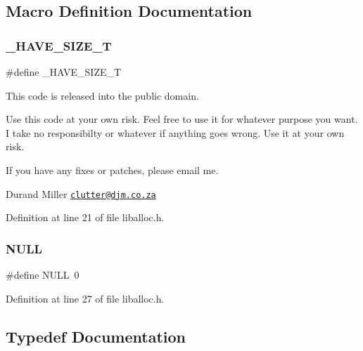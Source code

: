 \subsection{Macro Definition Documentation}
\mbox{\label{a00026_a40684528083f4cc0dfe3ca1accae3f79_a40684528083f4cc0dfe3ca1accae3f79}} 
\subsubsection{\texorpdfstring{\+\_\+\+H\+A\+V\+E\+\_\+\+S\+I\+Z\+E\+\_\+T}{\_HAVE\_SIZE\_T}}
{\footnotesize\ttfamily \#define \+\_\+\+H\+A\+V\+E\+\_\+\+S\+I\+Z\+E\+\_\+T}



This code is released into the public domain. 

Use this code at your own risk. Feel free to use it for whatever purpose you want. I take no responsibilty or whatever if anything goes wrong. Use it at your own risk.

If you have any fixes or patches, please email me.

Durand Miller \href{mailto:clutter@djm.co.za}{\tt clutter@djm.\+co.\+za} 

Definition at line 21 of file liballoc.\+h.

\mbox{\label{a00026_a070d2ce7b6bb7e5c05602aa8c308d0c4_a070d2ce7b6bb7e5c05602aa8c308d0c4}} 
\subsubsection{\texorpdfstring{N\+U\+LL}{NULL}}
{\footnotesize\ttfamily \#define N\+U\+LL~0}



Definition at line 27 of file liballoc.\+h.



\subsection{Typedef Documentation}
\mbox{\label{a00026_a7c94ea6f8948649f8d181ae55911eeaf_a7c94ea6f8948649f8d181ae55911eeaf}} 
